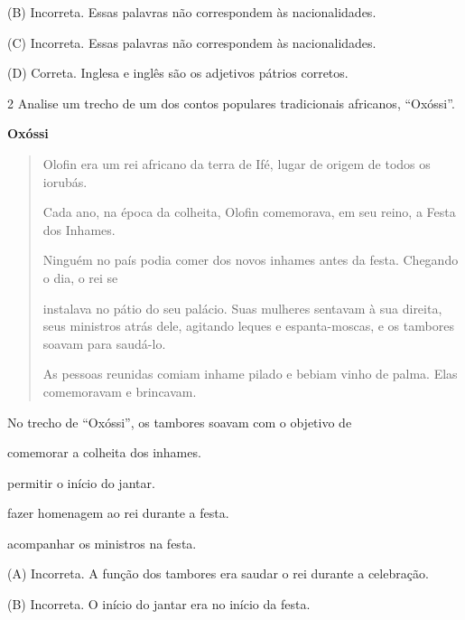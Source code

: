 (B) Incorreta. Essas palavras não correspondem às nacionalidades.

(C) Incorreta. Essas palavras não correspondem às nacionalidades.

(D) Correta. Inglesa e inglês são os adjetivos pátrios corretos.

\num{2} Analise um trecho de um dos contos populares tradicionais africanos, ``Oxóssi''.

\textbf{Oxóssi}

\begin{quote}
Olofin era um rei africano da terra de Ifé, lugar de origem de todos os
iorubás.

Cada ano, na época da colheita, Olofin comemorava, em seu reino, a Festa
dos Inhames.

Ninguém no país podia comer dos novos inhames antes da festa. Chegando o
dia, o rei se

instalava no pátio do seu palácio. Suas mulheres sentavam à sua direita,
seus ministros atrás dele, agitando leques e espanta-moscas, e os
tambores soavam para saudá-lo.

As pessoas reunidas comiam inhame pilado e bebiam vinho de palma. Elas
comemoravam e brincavam.
\end{quote}


No trecho de ``Oxóssi'', os tambores soavam com o objetivo de

\begin{escolha}
\item comemorar a colheita dos inhames.

\item permitir o início do jantar.

\item fazer homenagem ao rei durante a festa.

\item acompanhar os ministros na festa.
\end{escolha}


(A) Incorreta. A função dos tambores era saudar o rei durante a
celebração.

(B) Incorreta. O início do jantar era no início da festa.


